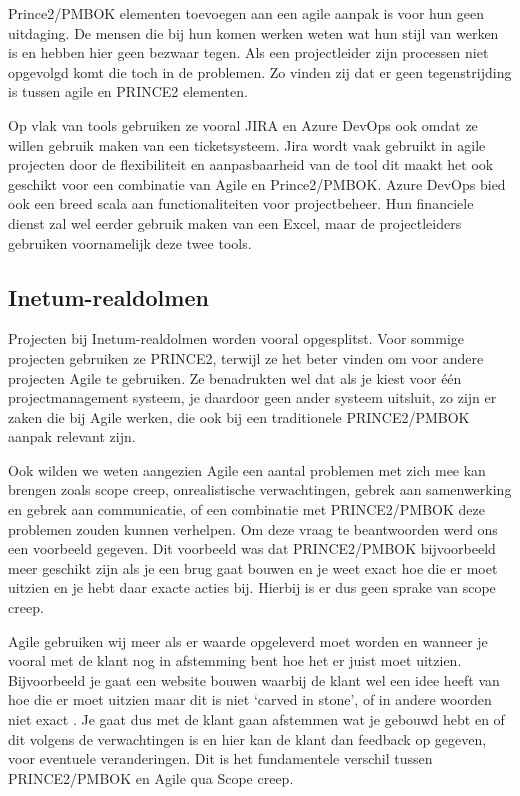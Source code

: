\documentclass[dutch]{hogent-article}
\begin{document}
Prince2/PMBOK elementen toevoegen aan een agile aanpak is voor hun geen uitdaging. De mensen die bij hun komen werken weten wat hun stijl van werken is en hebben hier geen bezwaar tegen.
Als een projectleider zijn processen niet opgevolgd komt die toch in de problemen. Zo vinden zij dat er geen tegenstrijding is tussen agile en PRINCE2 elementen.
\newline

Op vlak van tools gebruiken ze vooral JIRA en Azure DevOps ook omdat ze willen gebruik maken van een ticketsysteem.
Jira wordt vaak gebruikt in agile projecten door de flexibiliteit en aanpasbaarheid van de tool dit maakt het ook geschikt voor een combinatie van Agile en Prince2/PMBOK.
Azure DevOps bied ook een breed scala aan functionaliteiten voor projectbeheer.
Hun financiele dienst zal wel eerder gebruik maken van een Excel, maar de projectleiders gebruiken voornamelijk deze twee tools.


\subsection{Inetum-realdolmen}
\label{ssec:interview-Inetum-realdolmen}
Projecten bij Inetum-realdolmen worden vooral opgesplitst. Voor sommige projecten gebruiken ze PRINCE2, terwijl ze het beter vinden om voor andere projecten Agile te gebruiken. Ze benadrukten wel dat als je kiest voor één projectmanagement systeem, je daardoor geen ander systeem uitsluit, zo zijn er zaken die bij Agile werken, die ook bij een traditionele PRINCE2/PMBOK aanpak relevant zijn. 
\newline

Ook wilden we weten aangezien Agile een aantal problemen met zich mee kan brengen zoals scope creep, onrealistische verwachtingen, gebrek aan samenwerking en gebrek aan communicatie, of een combinatie met PRINCE2/PMBOK deze problemen zouden kunnen verhelpen. Om deze vraag te beantwoorden werd ons een voorbeeld gegeven. Dit voorbeeld was dat PRINCE2/PMBOK bijvoorbeeld meer geschikt zijn als je een brug gaat bouwen en je weet exact hoe die er moet uitzien en je hebt daar exacte acties bij. Hierbij is er dus geen sprake van scope creep. 
\newline

Agile gebruiken wij meer als er waarde opgeleverd moet worden  en wanneer je vooral met de klant nog in afstemming bent hoe het er juist moet uitzien. Bijvoorbeeld je gaat een website bouwen waarbij de klant wel een idee heeft van hoe die er moet uitzien maar dit is niet ‘carved in stone’, of in andere woorden niet exact . Je gaat dus met de klant gaan afstemmen wat je gebouwd hebt en of dit volgens de verwachtingen is en hier kan de klant dan feedback op gegeven, voor eventuele veranderingen. Dit is het fundamentele verschil tussen PRINCE2/PMBOK en Agile qua Scope creep. 
\newline
\end{document}
